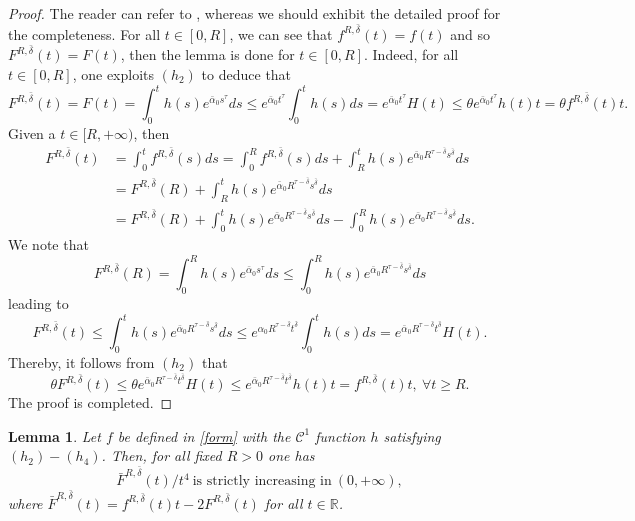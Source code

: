 \documentclass[11pt]{amsart}
\numberwithin{equation}{section}
\newtheorem{lemma}[theorem]{Lemma}
\theoremstyle{definition}
\newcommand{\R}{\mathbb{R}}
\begin{document}
\begin{proof}
The reader can refer to \cite{AS1,AS2}, whereas we should exhibit the detailed proof for the completeness.
For all $t\in[0,R]$,
 we can see that $f^{R,\bar{\delta}}(t)=f(t)$
 and so $F^{R,\bar{\delta}}(t)=F(t)$, then the lemma is done for $t\in[0,R]$.
Indeed, for all $t\in[0,R]$, one exploits $(h_2)$ to deduce that
\[
F^{R,\bar{\delta}}(t)=F(t)=\int_0^th(s)e^{\bar{\alpha}_0s^\tau}ds
\leq e^{\bar{\alpha}_0t^\tau}\int_0^th(s)ds=e^{\bar{\alpha}_0t^\tau}H(t)\leq
\theta e^{\bar{\alpha}_0t^\tau}h(t)t=\theta f^{R,\bar{\delta}}(t)t.
\]
Given a $t \in [R,+\infty)$, then
\begin{align*}
 F^{R,\bar{\delta}}(t)& =  \int_{0}^{t}f^{R,\bar{\delta}}(s) ds= \int_{0}^{R}f^{R,\bar{\delta}}(s) ds+
\int_{R}^{t}h(s)e^{\bar{\alpha}_0 R^{\tau-\bar{\delta}}s^{\bar{\delta}}} ds \\
   & = F^{R,\bar{\delta}}(R)+  \int_{R}^{t}h(s)e^{\bar{\alpha}_0 R^{\tau-\bar{\delta}}s^{\bar{\delta}}} ds \\
&=F^{R,\bar{\delta}}(R)+ \int_{0}^{t}h(s)e^{\bar{\alpha}_0 R^{\tau-\bar{\delta}}s^{\bar{\delta}}}ds
-\int_{0}^{R}h(s)e^{\bar{\alpha}_0 R^{\tau-\bar{\delta}}s^{\bar{\delta}}}ds.
\end{align*}
We note that
$$
F^{R,\bar{\delta}}(R)=\int_{0}^{R}h(s)e^{\bar{\alpha}_0 s^{\tau}} ds\leq \int_{0}^{R}h(s)e^{\bar{\alpha}_0 R^{\tau-\bar{\delta}}s^{\bar{\delta}}} ds
$$	
leading to
$$
F^{R,\bar{\delta}}(t) \leq \int_{0}^{t}h(s)e^{\bar{\alpha}_0 R^{\tau-\bar{\delta}}s^{\bar{\delta}}}ds
\leq e^{\alpha_0 R^{\tau-\bar{\delta}}t^{\bar{\delta}}}\int_{0}^{t}h(s) ds= e^{\bar{\alpha}_0 R^{\tau-\bar{\delta}}t^{\bar{\delta}}}H(t).
$$
Thereby, it follows from $(h_2)$ that
$$
\theta F^{R,\bar{\delta}}(t) \leq \theta e^{\bar{\alpha}_0 R^{\tau-\bar{\delta}}t^{\bar{\delta}}}H(t)
 \leq e^{\bar{\alpha}_0 R^{\tau-\bar{\delta}}t^{\bar{\delta}}} h(t)t=f^{R,\bar{\delta}}(t)t,~  \forall  t \geq R.
$$
The proof is completed.
\end{proof}

\begin{lemma}\label{monotone}
Let $f$ be defined in \eqref{form} with the $\mathcal{C}^1$ function $h$ satisfying $(h_2)-(h_4)$. Then, for all fixed $R>0$ one has
\[
 \bar{F}^{R,\bar{\delta}}(t)/t^{4}~\text{is strictly increasing in}~(0,+\infty),
\]
where $\bar{F}^{R,\bar{\delta}}(t)=f^{R,\bar{\delta}}(t)t-2F^{R,\bar{\delta}}(t)$ for all $t\in\R$.
\end{lemma}
\end{document}
